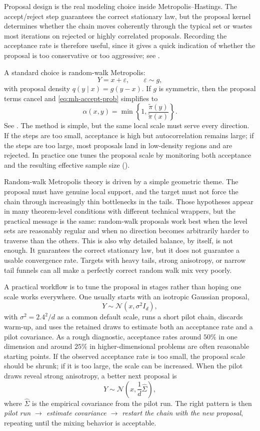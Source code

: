 Proposal design is the real modeling choice inside Metropolis--Hastings.
The accept/reject step guarantees the correct stationary law, but the proposal kernel determines whether the chain moves coherently through the typical set or wastes most iterations on rejected or highly correlated proposals.
Recording the acceptance rate is therefore useful, since it gives a quick indication of whether the proposal is too conservative or too aggressive; see \citet[\S5.8]{liu_2002_monte_carlo}.

A standard choice is random-walk Metropolis:
\[
  Y = x + \varepsilon,
  \qquad
  \varepsilon \sim g,
\]
with proposal density $q(y\mid x)=g(y-x)$.
If $g$ is symmetric, then the proposal terms cancel and \eqref{eq:mh-accept-prob} simplifies to
\[
  \alpha(x,y)=\min\!\left\{1,\frac{\tilde\pi(y)}{\tilde\pi(x)}\right\}.
\]
See \citet[\S5.4.1]{liu_2002_monte_carlo}.
The method is simple, but the same local scale must serve every direction.
If the steps are too small, acceptance is high but autocorrelation remains large; if the steps are too large, most proposals land in low-density regions and are rejected.
In practice one tunes the proposal scale by monitoring both acceptance and the resulting effective sample size ().

Random-walk Metropolis theory is driven by a simple geometric theme.
The proposal must have genuine local support, and the target must not force the chain through increasingly thin bottlenecks in the tails.
Those hypotheses appear in many theorem-level conditions with different technical wrappers, but the practical message is the same:
random-walk proposals work best when the level sets are reasonably regular and when no direction becomes arbitrarily harder to traverse than the others.
This is also why detailed balance, by itself, is not enough.
It guarantees the correct stationary law, but it does not guarantee a usable convergence rate.
Targets with heavy tails, strong anisotropy, or narrow tail funnels can all make a perfectly correct random walk mix very poorly.

A practical workflow is to tune the proposal in stages rather than hoping one scale works everywhere.
One usually starts with an isotropic Gaussian proposal,
\[
  Y \sim \mathcal{N}(x,\sigma^2 I_d),
\]
with $\sigma^2=2.4^2/d$ as a common default scale,
runs a short pilot chain, discards warm-up, and uses the retained draws to estimate both an acceptance rate and a pilot covariance.
As a rough diagnostic, acceptance rates around $50\%$ in one dimension and around $25\%$ in higher-dimensional problems are often reasonable starting points.
If the observed acceptance rate is too small, the proposal scale should be shrunk; if it is too large, the scale can be increased.
When the pilot draws reveal strong anisotropy, a better next proposal is
\[
  Y \sim \mathcal{N}\!\left(x,\frac{1}{d}\hat\Sigma\right),
\]
where $\hat\Sigma$ is the empirical covariance from the pilot run.
The right pattern is then \emph{pilot run $\to$ estimate covariance $\to$ restart the chain with the new proposal}, repeating until the mixing behavior is acceptable.

